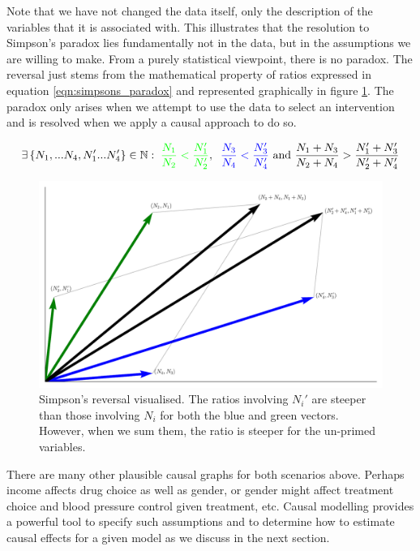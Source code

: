 \documentclass[11pt,a4paper,twoside]{report}
\newcommand{\set}[1]{\left\{#1\right\}}
\newcommand{\eqn}[1]{\begin{align}#1\end{align}}
\theoremstyle{plain}
\theoremstyle{definition}
\begin{document}
Note that we have not changed the data itself, only the description of the variables that it is associated with. This illustrates that the resolution to Simpson's paradox lies fundamentally not in the data, but in the assumptions we are willing to make. From a purely statistical viewpoint, there is no paradox. The reversal just stems from the mathematical property of ratios expressed in equation \ref{eqn:simpsons_paradox} and represented graphically in figure \ref{fig:simpsons_vector}. The paradox only arises when we attempt to use the data to select an intervention and is resolved when we apply a causal approach to do so.

\eqn{
\label{eqn:simpsons_paradox}
\exists \set{N_1,...N_4, N_1'...N_4'} \in \mathbb{N} : \; 
\textcolor{green}{\frac{N_1}{N_2}< \frac{N_1'}{N_2'}}, \;\; 
\textcolor{blue}{ \frac{N_3}{N_4}<\frac{N_3'}{N_4'}}
 \text{ and } \frac{N_1+N_3}{N_2+N_4} > \frac{N_1'+N_3'}{N_2'+N_4'}
}

\begin{figure}
\centering
\includegraphics[scale=.4]{figures/simpson_vector}
\caption{Simpson's reversal visualised. The ratios involving $N_i'$ are steeper than those involving $N_i$ for both the blue and green vectors. However, when we sum them, the ratio is steeper for the un-primed variables.}
\label{fig:simpsons_vector}
\end{figure}

There are many other plausible causal graphs for both scenarios above. Perhaps income affects drug choice as well as gender, or gender might affect treatment choice and blood pressure control given treatment, etc. Causal modelling provides a powerful tool to specify such assumptions and to determine how to estimate causal effects for a given model as we discuss in the next section.
\end{document}
